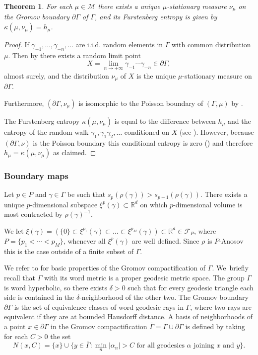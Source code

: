 \documentclass[10pt,a4paper]{amsart}
\let\ts\textstyle
\newtheorem{theorem}{Theorem}[section]
\newcommand{\R}{\mathbb{R}}
\newcommand{\F}{\mathcal{F}}
\newcommand{\M}{\mathcal M}
\let\g\gamma
\begin{document}
\begin{theorem}\label{furstenberg}
For each \(\mu \in \M\) there exists a unique \(\mu\)-stationary measure \(\nu_\mu\) on the Gromov boundary \(\partial \Gamma\) of \(\Gamma\), and its Furstenberg entropy is given by \(\kappa(\mu,\nu_\mu) = h_\mu\).
\end{theorem}
\begin{proof}
If \(\g_{-1},\ldots, \g_{-n},\ldots\) are i.i.d. random elements in \(\Gamma\) with common distribution \(\mu\). Then by \cite[Th.\,7.6]{Kai00} there exists a random limit point
\[
X = \lim_{n \to +\infty}\g_{-1}\cdots \g_{-n} \in \partial\Gamma,
\]
almost surely, and the distribution \(\nu_\mu\) of \(X\) is the unique \(\mu\)-stationary measure on \(\partial \Gamma\).

Furthermore, \((\partial \Gamma,\nu_\mu)\) is isomorphic to the Poisson boundary of \((\Gamma,\mu)\) by \cite[Th.\,7.7]{Kai00}.

The Furstenberg entropy \(\kappa(\mu,\nu_\mu)\) is equal to the difference between \(h_\mu\) and the entropy of the random walk \(\g_1, \g_1\g_2,\ldots\) conditioned on \(X\) (see \cite[Cor.\,2]{KV83}). However, because \((\partial \Gamma,\nu)\) is the Poisson boundary this conditional entropy is zero (\cite[Th.\,4.3 and 4.5]{Kai00}) and therefore \(h_\mu = \kappa(\mu,\nu_\mu)\) as claimed.
\end{proof}

\subsubsection{Boundary maps}

Let \(p \in P \) and \(\gamma \in \Gamma\) be such that \(s_p(\rho(\gamma)) > s_{p+1}(\rho(\gamma))\).
There exists a unique \(p\)-dimensional subspace \(\xi^p(\gamma) \subset \R^d\) on which \(p\)-dimensional volume is most contracted by \(\rho(\gamma)^{-1}\).

We let \(\xi(\gamma) = (\{0\} \!\subset\! \xi^{p_1}(\gamma) \!\subset\! \ldots \!\subset\! \xi^{p_{M}}(\gamma))\!\subset\! \R^d \in \F_P\), where \hbox{\(P = \lbrace p_1 < \cdots < p_{M} \rbrace\)}, whenever all \(\xi^p(\gamma)\) are well defined.
Since \(\rho\) is \(P\)-Anosov this is the case outside of a finite subset of \(\Gamma\).

We refer to \cite[Chap.\,7]{GdlH90} for basic properties of the Gromov compactification of \(\Gamma\). We~briefly recall that \(\Gamma\) with its word metric is a proper geodesic metric space.
The group \(\Gamma\) is word hyperbolic, so there exists \(\delta > 0\) such that for every geodesic triangle each side is contained in the \(\delta\)-neighborhood of the other two.
The Gromov boundary \(\partial \Gamma\) is the set of equivalence classes of word geodesic rays in \(\Gamma\), where two rays are equivalent if they are at bounded Hausdorff distance.
A basis of neighborhoods of a point \(x \in \partial \Gamma\) in the Gromov compactification \(\overline{\Gamma} = \Gamma \cup \partial \Gamma\) is defined by taking for each \(C > 0\) the set
\[
\ts N(x,C) = \lbrace x\rbrace \cup \lbrace y \in \overline{\Gamma}: \min_{n} |\alpha_n| > C\text{ for all geodesics }\alpha\text{ joining }x\text{ and }y\rbrace.
\]
\end{document}
